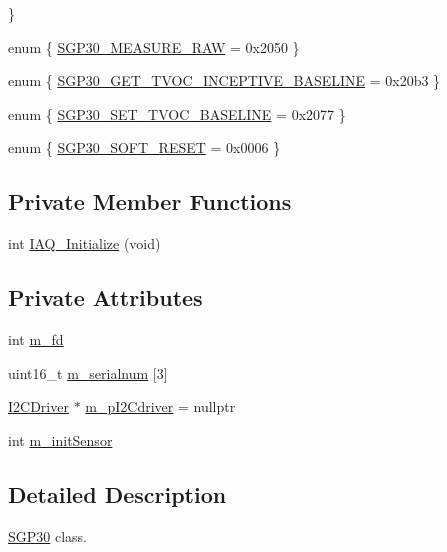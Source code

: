\begin{DoxyCompactItemize}
 \}
\item 
enum \{ \hyperlink{classSGP30_ae79520d1a6d2d0b51a33f66bda330426a4b9de0c35084e50e2314402541630294}{S\+G\+P30\+\_\+\+M\+E\+A\+S\+U\+R\+E\+\_\+\+R\+AW} = 0x2050
 \}
\item 
enum \{ \hyperlink{classSGP30_aa3eee88b9594f8df87e651374c4a1016ac75ca98ed28bb4b660cde006d6ea03ed}{S\+G\+P30\+\_\+\+G\+E\+T\+\_\+\+T\+V\+O\+C\+\_\+\+I\+N\+C\+E\+P\+T\+I\+V\+E\+\_\+\+B\+A\+S\+E\+L\+I\+NE} = 0x20b3
 \}
\item 
enum \{ \hyperlink{classSGP30_a4a464453ec9603419c3d49ad5c3fd21ca2c77db1c8c9a871d505a7a54f13fa05f}{S\+G\+P30\+\_\+\+S\+E\+T\+\_\+\+T\+V\+O\+C\+\_\+\+B\+A\+S\+E\+L\+I\+NE} = 0x2077
 \}
\item 
enum \{ \hyperlink{classSGP30_a48c35303e4f88d4b9bed717184795c2eae7362fc1d71c48cca9c68611d5348007}{S\+G\+P30\+\_\+\+S\+O\+F\+T\+\_\+\+R\+E\+S\+ET} = 0x0006
 \}
\end{DoxyCompactItemize}
\subsection*{Private Member Functions}
\begin{DoxyCompactItemize}
\item 
int \hyperlink{classSGP30_a4419a25b8e25a133c3cfc876b3443669}{I\+A\+Q\+\_\+\+Initialize} (void)
\end{DoxyCompactItemize}
\subsection*{Private Attributes}
\begin{DoxyCompactItemize}
\item 
int \hyperlink{classSGP30_a751dee30db306b3f2ff17540adb7dfc9}{m\+\_\+fd}
\item 
uint16\+\_\+t \hyperlink{classSGP30_a6da04f39b302756d806d36ff3aa93293}{m\+\_\+serialnum} \mbox{[}3\mbox{]}
\item 
\hyperlink{classI2CDriver}{I2\+C\+Driver} $\ast$ \hyperlink{classSGP30_a3be2d504b90a81a66af2bcd4fc96673b}{m\+\_\+p\+I2\+Cdriver} = nullptr
\item 
int \hyperlink{classSGP30_a11b0db4fcffa5e8da8982a48ae0b1456}{m\+\_\+init\+Sensor}
\end{DoxyCompactItemize}


\subsection{Detailed Description}
\hyperlink{classSGP30}{S\+G\+P30} class. 

